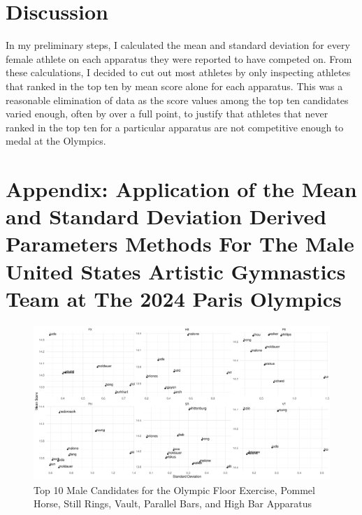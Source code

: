 \documentclass[12pt]{article}
\begin{document}
\section{Discussion}
\label{sec:dis}

In my preliminary steps, I calculated the mean and standard deviation for every female athlete on each 
apparatus they were reported to have competed on. From these calculations, I decided to cut out most athletes 
by only inspecting athletes that ranked in the top ten by mean score alone for each apparatus. This was a 
reasonable elimination of data as the score values among the top ten candidates varied enough, often by over a 
full point, to justify that athletes that never ranked in the top ten for a particular apparatus are not 
competitive enough to medal at the Olympics.



\appendix

\section{Appendix: Application of the Mean and Standard Deviation Derived Parameters Methods For The Male 
United States Artistic Gymnastics Team at The 2024 Paris Olympics}

\begin{figure}
  \centering
  \includegraphics[scale=0.5]{MaleAthleteApparatus.pdf}
  \caption{Top 10 Male Candidates for the Olympic Floor Exercise, Pommel Horse, Still Rings, Vault, Parallel Bars, 
  and High Bar Apparatus}
  \label{fig:MA}
\end{figure}
\end{document}

